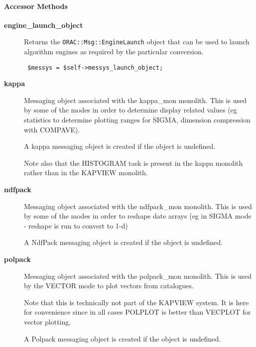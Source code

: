 \paragraph*{Accessor Methods\label{ORAC::Display::KAPVIEW_Accessor_Methods}}\begin{description}
\item[\textbf{engine\_launch\_object}] \mbox{}

Returns the \texttt{ORAC::Msg::EngineLaunch} object that can be used
to launch algorithm engines as required by the particular
conversion.

\begin{verbatim}
 $messys = $self->messys_launch_object;
\end{verbatim}
\item[\textbf{kappa}] \mbox{}

Messaging object associated with the kappa\_mon monolith.
This is used by some of the modes in order to determine
display related values (eg statistics to determine plotting
ranges for SIGMA, dimension compression with COMPAVE).



A kappa messaging object is created if the object is undefined.



Note also that the HISTOGRAM task is present in the kappa monolith
rather than in the KAPVIEW monolith.

\item[\textbf{ndfpack}] \mbox{}

Messaging object associated with the ndfpack\_mon monolith.
This is used by some of the modes in order to reshape
date arrays (eg in SIGMA mode - reshape is run to convert
to 1-d)



A NdfPack messaging object is created if the object is undefined.

\item[\textbf{polpack}] \mbox{}

Messaging object associated with the polpack\_mon monolith.
This is used by the VECTOR mode to plot vectors from catalogues.



Note that this is technically not part of the KAPVIEW system.
It is here for convenience since in all cases POLPLOT is better
than VECPLOT for vector plotting.



A Polpack messaging object is created if the object is undefined.




\end{description}
